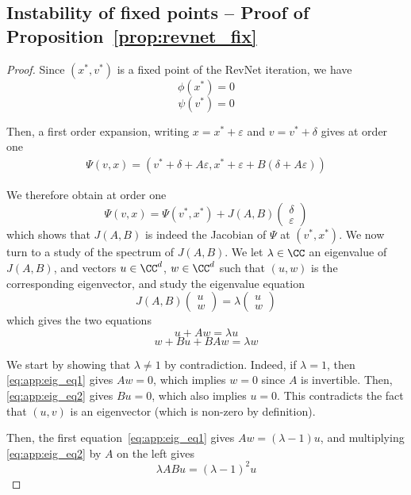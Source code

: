 \documentclass{article}
\begin{document}
\subsection{Instability of fixed points -- Proof of Proposition~\ref{prop:revnet_fix}}
\begin{proof}
Since $(x^*, v^*)$ is a fixed point of the RevNet iteration, we have
$$
\phi(x^*) = 0
$$
$$
\psi(v^*)=0
$$

Then, a first order expansion, writing $x = x^*+\varepsilon$ and $v= v^*+\delta$ gives at order one
\begin{align}
    \Psi(v, x) = \left(v^* + \delta + A\varepsilon, x^* + \varepsilon + B(\delta + A\varepsilon)\right)
\end{align}

We therefore obtain at order one
$$
\Psi(v, x) = \Psi(v^*, x^*) + J(A, B)
\begin{pmatrix}
\delta\\
\varepsilon
\end{pmatrix}
$$
which shows that $J(A, B)$ is indeed the Jacobian of $\Psi$ at $(v^*, x^*)$.
We now turn to a study of the spectrum of $J(A, B)$.
We let $\lambda \in \CC$ an eigenvalue of $J(A, B)$, and vectors $u\in\CC^d$, $w\in\CC^d$ such that $(u, w)$ is the corresponding eigenvector, and study the eigenvalue equation
$$
J(A, B)
\begin{pmatrix}
u\\
w
\end{pmatrix}
= \lambda
\begin{pmatrix}
u\\
w
\end{pmatrix}
$$
which gives the two equations
\begin{equation}
    \label{eq:app:eig_eq1}
    u + Aw = \lambda u
\end{equation}
\begin{equation}
\label{eq:app:eig_eq2}    
w + Bu + BAw = \lambda w
\end{equation}

We start by showing that $\lambda \neq 1$ by contradiction.
Indeed, if $\lambda = 1$, then \eqref{eq:app:eig_eq1} gives $Aw = 0$, which implies $w  =0$ since $A$ is invertible. Then, \eqref{eq:app:eig_eq2} gives $Bu=0$, which also implies $u=0$. This contradicts the fact that $(u, v)$ is an eigenvector (which is non-zero by definition).

Then, the first equation~\eqref{eq:app:eig_eq1} gives $Aw = (\lambda - 1)u$, and multiplying \eqref{eq:app:eig_eq2} by $A$ on the left gives
\begin{equation}
    \label{eq:app:eig_eq3}
    \lambda  ABu = (\lambda - 1)^2 u
\end{equation}


\end{proof}
\end{document}
